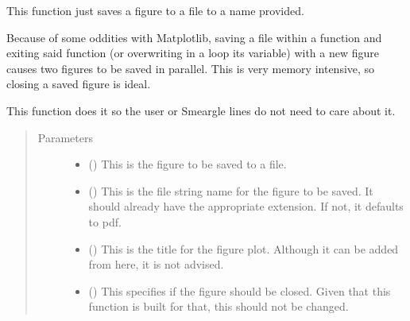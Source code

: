 \documentclass[letterpaper,10pt,english]{sphinxmanual}
\begin{document}
\begin{fulllineitems}
\label{\detokenize{python_docstrings/IfA_Smeargle.meta.io:IfA_Smeargle.meta.io.smeargle_save_figure_file}}
This function just saves a figure to a file to a name provided.

Because of some oddities with Matplotlib, saving a file within a function
and exiting said function (or overwriting in a loop its variable) with a
new figure causes two figures to be saved in parallel. This is very
memory intensive, so closing a saved figure is ideal.

This function does it so the user or Smeargle lines do not need to care
about it.
\begin{quote}\begin{description}
\item[{Parameters}] \leavevmode\begin{itemize}
\item {} 
 () \textendash{} This is the figure to be saved to a file.

\item {} 
 () \textendash{} This is the file string name for the figure to be saved. It should
already have the appropriate extension. If not, it defaults to pdf.

\item {} 
 (\sphinxstyleliteralemphasis{\sphinxupquote{ (}}\sphinxstyleliteralemphasis{\sphinxupquote{)}}) \textendash{} This is the title for the figure plot. Although it can be added from
here, it is not advised.

\item {} 
 (\sphinxstyleliteralemphasis{\sphinxupquote{ (}}\sphinxstyleliteralemphasis{\sphinxupquote{)}}) \textendash{} This specifies if the figure should be closed. Given that this
function is built for that, this should not be changed.


\end{itemize}
\end{description}
\end{quote}
\end{fulllineitems}
\end{document}
